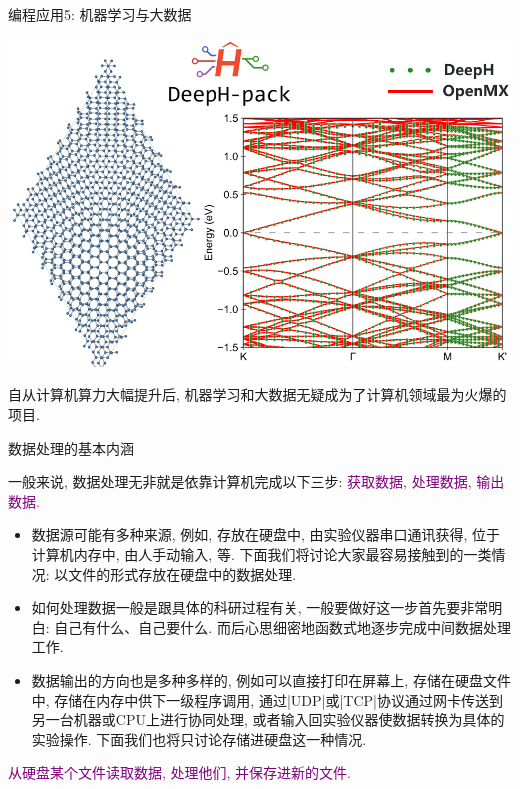 \documentclass{beamer}
\newcommand{\purple}{\textcolor{purple}}
\begin{document}
    \begin{frame}{编程应用5: 机器学习与大数据}
      \centering
      \begin{tcolorbox}[beamer,width=0.8\textwidth,arc=0pt,boxsep=0pt,left=1pt,right=1pt,top=1pt,bottom=1pt]
        \includegraphics[width=\textwidth]{figure/deeph.png}
      \end{tcolorbox}
      \begin{block}{}
        自从计算机算力大幅提升后, 机器学习和大数据无疑成为了计算机领域最为火爆的项目.
      \end{block}
    \end{frame}

    \begin{frame}[fragile]{数据处理的基本内涵}
      \begin{block}{}
         一般来说, 数据处理无非就是依靠计算机完成以下三步: \purple{获取数据, 处理数据, 输出数据.}
         \begin{itemize}
           \item 数据源可能有多种来源, 例如, 存放在硬盘中, 由实验仪器串口通讯获得, 位于计算机内存中, 由人手动输入, 等. 下面我们将讨论大家最容易接触到的一类情况: 以文件的形式存放在硬盘中的数据处理. 
           \item 如何处理数据一般是跟具体的科研过程有关, 一般要做好这一步首先要非常明白: 自己有什么、自己要什么. 而后心思细密地函数式地逐步完成中间数据处理工作.
           \item 数据输出的方向也是多种多样的, 例如可以直接打印在屏幕上, 存储在硬盘文件中, 存储在内存中供下一级程序调用, 通过\cverb|UDP|或\cverb|TCP|协议通过网卡传送到另一台机器或CPU上进行协同处理, 或者输入回实验仪器使数据转换为具体的实验操作. 下面我们也将只讨论存储进硬盘这一种情况. 
         \end{itemize}
      \end{block}
      \purple{从硬盘某个文件读取数据, 处理他们, 并保存进新的文件.}
    \end{frame}
\end{document}
